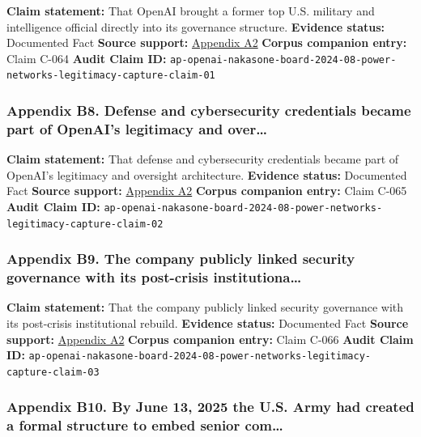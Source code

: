 \documentclass[
  american,
  11pt,
  letterpaper,
]{article}
\begin{document}
\textbf{Claim statement:} That OpenAI brought a former top U.S. military
and intelligence official directly into its governance structure.
\textbf{Evidence status:} Documented Fact \textbf{Source support:}
\hyperref[ch-08-appendix-a2-openai-appoints-former-top-us-cyberwarrior-paul-nakasone-to-its-board-of-directors]{Appendix
A2} \textbf{Corpus companion entry:} Claim C-064 \textbf{Audit Claim
ID:}
\texttt{ap-openai-nakasone-board-2024-08-power-networks-legitimacy-capture-claim-01}

\subsubsection{Appendix B8. Defense and cybersecurity credentials became
part of OpenAI's legitimacy and
over\ldots{}}\label{ch-08-appendix-b8-defense-and-cybersecurity-credentials-became-part-of-openai-s-legitimacy-and-over}

\textbf{Claim statement:} That defense and cybersecurity credentials
became part of OpenAI's legitimacy and oversight architecture.
\textbf{Evidence status:} Documented Fact \textbf{Source support:}
\hyperref[ch-08-appendix-a2-openai-appoints-former-top-us-cyberwarrior-paul-nakasone-to-its-board-of-directors]{Appendix
A2} \textbf{Corpus companion entry:} Claim C-065 \textbf{Audit Claim
ID:}
\texttt{ap-openai-nakasone-board-2024-08-power-networks-legitimacy-capture-claim-02}

\subsubsection{Appendix B9. The company publicly linked security
governance with its post-crisis
institutiona\ldots{}}\label{ch-08-appendix-b9-the-company-publicly-linked-security-governance-with-its-post-crisis-institutiona}

\textbf{Claim statement:} That the company publicly linked security
governance with its post-crisis institutional rebuild. \textbf{Evidence
status:} Documented Fact \textbf{Source support:}
\hyperref[ch-08-appendix-a2-openai-appoints-former-top-us-cyberwarrior-paul-nakasone-to-its-board-of-directors]{Appendix
A2} \textbf{Corpus companion entry:} Claim C-066 \textbf{Audit Claim
ID:}
\texttt{ap-openai-nakasone-board-2024-08-power-networks-legitimacy-capture-claim-03}

\subsubsection{Appendix B10. By June 13, 2025 the U.S. Army had created
a formal structure to embed senior
com\ldots{}}\label{ch-08-appendix-b10-by-june-13-2025-the-u-s-army-had-created-a-formal-structure-to-embed-senior-com}
\end{document}
